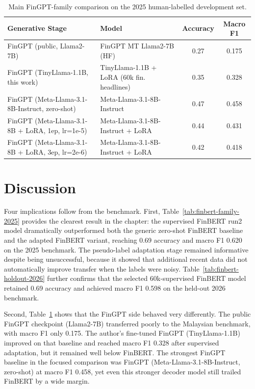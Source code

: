 \documentclass[12pt]{ucetd}
\begin{document}
\begin{table}[H]
\caption{Main FinGPT-family comparison on the 2025 human-labelled development set.}
\label{tab:fingpt-family-2025}
\centering
\small
\begin{tabular}{|l|l|c|c|}
\hline
\textbf{Generative Stage} & \textbf{Model} & \textbf{Accuracy} & \textbf{Macro F1} \\
\hline
FinGPT (public, Llama2-7B) & FinGPT MT Llama2-7B (HF) & 0.27 & 0.175 \\
FinGPT (TinyLlama-1.1B, this work) & TinyLlama-1.1B + LoRA (60k fin. headlines) & 0.35 & 0.328 \\
FinGPT (Meta-Llama-3.1-8B-Instruct, zero-shot) & Meta-Llama-3.1-8B-Instruct & 0.47 & 0.458 \\
FinGPT (Meta-Llama-3.1-8B + LoRA, 1ep, lr=1e-5) & Meta-Llama-3.1-8B-Instruct + LoRA & 0.44 & 0.431 \\
FinGPT (Meta-Llama-3.1-8B + LoRA, 3ep, lr=2e-6) & Meta-Llama-3.1-8B-Instruct + LoRA & 0.42 & 0.418 \\
\hline
\end{tabular}
\end{table}

\section{Discussion}

Four implications follow from the benchmark. First, Table~\ref{tab:finbert-family-2025} provides the clearest result in the chapter: the supervised FinBERT run2 model dramatically outperformed both the generic zero-shot FinBERT baseline and the adapted FinBERT variant, reaching 0.69 accuracy and macro F1 0.620 on the 2025 benchmark. The pseudo-label adaptation stage remained informative despite being unsuccessful, because it showed that additional recent data did not automatically improve transfer when the labels were noisy. Table~\ref{tab:finbert-holdout-2026} further confirms that the selected 60k-supervised FinBERT model retained 0.69 accuracy and achieved macro F1 0.598 on the held-out 2026 benchmark.

Second, Table~\ref{tab:fingpt-family-2025} shows that the FinGPT side behaved very differently. The public FinGPT checkpoint (Llama2-7B) transferred poorly to the Malaysian benchmark, with macro F1 only 0.175. The author's fine-tuned FinGPT (TinyLlama-1.1B) improved on that baseline and reached macro F1 0.328 after supervised adaptation, but it remained well below FinBERT. The strongest FinGPT baseline in the focused comparison was FinGPT (Meta-Llama-3.1-8B-Instruct, zero-shot) at macro F1 0.458, yet even this stronger decoder model still trailed FinBERT by a wide margin.
\end{document}
